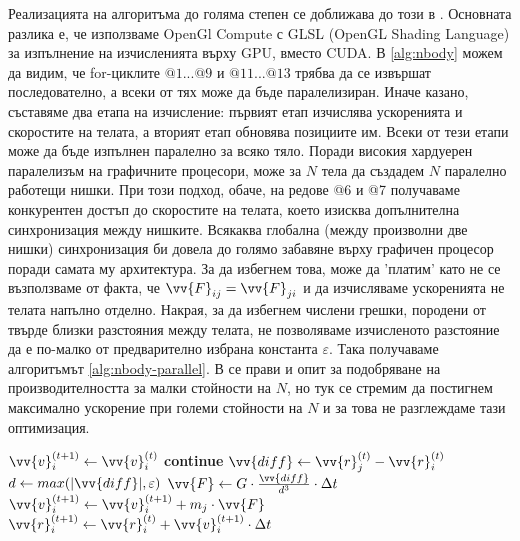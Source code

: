 \documentclass[11pt, a4paper]{article}
\begin{document}
\begin{sloppypar}
Реализацията на алгоритъма до голяма степен се доближава до този в \cite{nylons2007fast}. Основната разлика е, че използваме OpenGl Compute с GLSL (OpenGL Shading Language) за изпълнение на изчисленията върху GPU, вместо CUDA. В \ref{alg:nbody} можем да видим, че for-циклите $@1...@9$ и $@11...@13$ трябва да се извършат последователно, а всеки от тях може да бъде паралелизиран. Иначе казано, съставяме два етапа на изчисление: първият етап изчислява ускоренията и скоростите на телата, а вторият етап обновява позициите им. Всеки от тези етапи може да бъде изпълнен паралелно за всяко тяло. Поради високия хардуерен паралелизъм на графичните процесори, може за $N$ тела да създадем $N$ паралелно работещи нишки. При този подход, обаче, на редове @6 и @7 получаваме конкурентен достъп до скоростите на телата, което изисква допълнителна синхронизация между нишките. Всякаква глобална (между произволни две нишки) синхронизация би довела до голямо забавяне върху графичен процесор поради самата му архитектура. За да избегнем това, може да 'платим' като не се възползваме от факта, че $\vv{F}_{ij} = \vv{F}_{ji}$ и да изчисляваме ускоренията не телата напълно отделно. Накрая, за да избегнем числени грешки, породени от твърде близки разстояния между телата, не позволяваме изчисленото разстояние да е по-малко от предварително избрана константа $\varepsilon$. Така получаваме алгоритъмът \ref{alg:nbody-parallel}. В \cite{nylons2007fast} се прави и опит за подобряване на производителността за малки стойности на $N$, но тук се стремим да постигнем максимално ускорение при големи стойности на $N$ и за това не разглеждаме тази оптимизация.

\begin{algorithm}
\caption{Паралелна N-Body симулация по двойки обекти}
\label{alg:nbody-parallel}
\begin{algorithmic}[1]

	\State $\vv{v}_i^{(t+1)} \gets \vv{v}_i^{(t)}$
			\State \textbf{continue}
		\EndIf
		\State $\vv{diff} \gets \vv{r}_j^{(t)} - \vv{r}_i^{(t)}$
		\State $d \gets max(|\vv{diff}|, \varepsilon)$
		\State $\vv{F} \gets G \cdot \frac{\vv{diff}}{d^3} \cdot \Delta t$
		\State $\vv{v}_i^{(t+1)} \gets \vv{v}_i^{(t+1)} + m_j \cdot \vv{F}$
	\EndFor
\EndFor
{}
	\State $\vv{r}_i^{(t+1)} \gets \vv{r}_i^{(t)} + \vv{v}_i^{(t+1)} \cdot \Delta t$
\EndFor


\end{algorithmic}
\end{algorithm}


\end{sloppypar}
\end{document}

